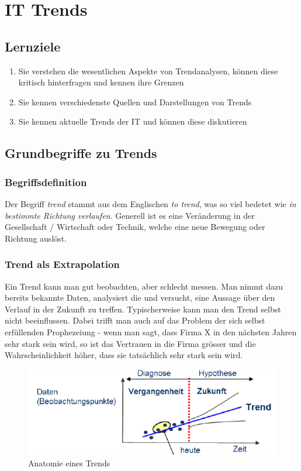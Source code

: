 \chapter{IT Trends}
\section{Lernziele}
\begin{enumerate}
	\item Sie verstehen die wesentlichen Aspekte von Trendanalysen, können diese kritisch hinterfragen und kennen ihre Grenzen
	\item Sie kennen verschiedenste Quellen und Darstellungen von Trends
	\item Sie kennen aktuelle Trends der IT und können diese diskutieren
\end{enumerate}
\section{Grundbegriffe zu Trends}
\subsection{Begriffsdefinition}
Der Begriff \textit{trend} stammt aus dem Englischen \textit{to trend}, was so viel bedetet wie \textit{in bestimmte  Richtung verlaufen}. Generell ist es eine Veränderung in der Gesellschaft / Wirtschaft oder Technik, welche eine neue Bewegung oder Richtung auslöst.
\subsection{Trend als Extrapolation}
Ein Trend kann man gut beobachten, aber schlecht messen. Man nimmt dazu bereits bekannte Daten, analysiert die und versucht, eine Aussage über den Verlauf in der Zukunft zu treffen. Typischerweise kann man den Trend selbst nicht beeinflussen. Dabei trifft man auch auf das Problem der sich selbst erfüllenden Prophezeiung - wenn man sagt, dass Firma X in den nächsten Jahren sehr stark sein wird, so ist das Vertrauen in die Firma grösser und die Wahrscheinlichkeit höher, dass sie tatsächlich sehr stark sein wird.
\begin{figure}
\centering
\includegraphics[width=0.7\linewidth]{fig/trend}
\caption{Anatomie eines Trends}
\label{fig:trend}
\end{figure}
